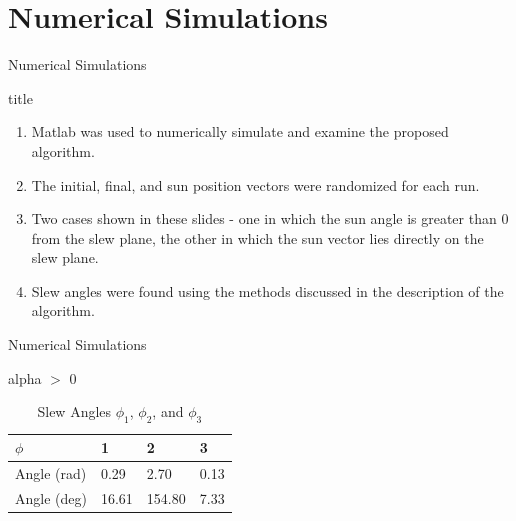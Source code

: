 \documentclass{beamer}
\begin{document}
\section{Numerical Simulations}
\begin{frame}{Numerical Simulations} 
	\begin{block}{title}
		\begin{enumerate}
			\item Matlab was used to numerically simulate and examine the proposed algorithm. 
			\item The initial, final, and sun position vectors were randomized for each run. 
			\item Two cases shown in these slides - one in which the sun angle is greater than 0 from the slew plane, the other in which the sun vector lies directly on the slew plane. 
			\item Slew angles were found using the methods discussed in the description of the algorithm. 
		\end{enumerate}
	\end{block}
\end{frame}
\begin{frame}{Numerical Simulations}
\begin{block}{alpha $>$ 0}
	
	\begin{table}[H]
		\centering
		\caption{Slew Angles $\phi_1$, $\phi_2$, and $\phi_3$}
		\begin{tabular}{llll}
			\toprule
			\midrule
			$\phi$ & 1 & 2 & 3 \\
			\midrule
			Angle (rad) & 0.29 & 2.70 & 0.13 \\
			Angle (deg) & 16.61 & 154.80 & 7.33 \\ 
			\midrule
			\bottomrule
		\end{tabular}%
		\label{tab:FOG_SF}%
	\end{table}%
	
\end{block}
\end{frame}
\end{document}
